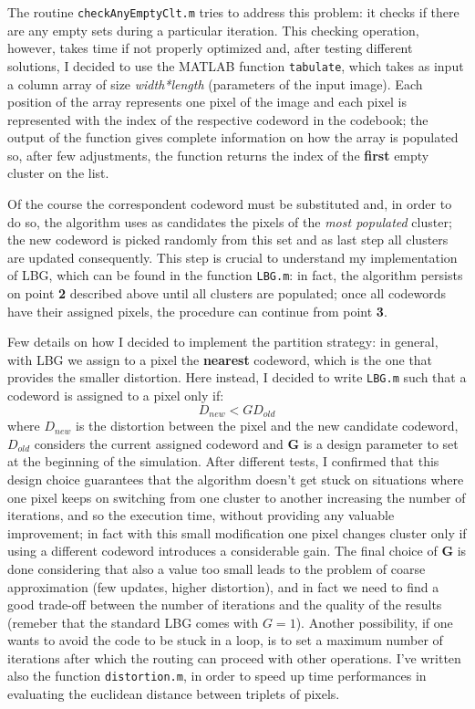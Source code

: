 \documentclass{article}
\def\code#1{\texttt{#1}}
\begin{document}
The routine \code{checkAnyEmptyClt.m} tries to address this problem: it checks if there are any empty sets during a particular iteration. This checking operation, however, takes time if not properly optimized and, after testing different solutions, I decided to use the MATLAB function \code{tabulate}, which takes as input a column array of size \textit{width*length} (parameters of the input image). Each position of the array represents one pixel of the image and each pixel is represented with the index of the respective codeword in the codebook; the output of the function gives complete information on how the array is populated so, after few adjustments, the function returns the index of the \textbf{first} empty cluster on the list. 

Of the course the correspondent codeword must be substituted and, in order to do so, the algorithm uses as candidates the pixels of the \textit{most populated} cluster; the new codeword is picked randomly from this set and as last step all clusters are updated consequently. This step is crucial to understand my implementation of LBG, which can be found in the function \code{LBG.m}: in fact, the algorithm persists on point \textbf{2} described above until all clusters are populated; once all codewords have their assigned pixels, the procedure can continue from point \textbf{3}.

Few details on how I decided to implement the partition strategy: in general, with LBG we assign to a pixel the \textbf{nearest} codeword, which is the one that provides the smaller distortion. Here instead, I decided to write \code{LBG.m} such that a codeword is assigned to a pixel only if: 
\begin{equation}
D_{new} < GD_{old}
\end{equation}
where $D_{new}$ is the distortion between the pixel and the new candidate codeword, $D_{old}$ considers the current assigned codeword and $\mathbf{G}$ is a design parameter to set at the beginning of the simulation. After different tests, I confirmed that this design choice guarantees that the algorithm doesn't get stuck on situations where one pixel keeps on switching from one cluster to another increasing the number of iterations, and so the execution time, without providing any valuable improvement; in fact with this small modification one pixel changes cluster only if using a different codeword introduces a considerable gain. The final choice of \textbf{G} is done considering that also a value too small leads to the problem of coarse approximation (few updates, higher distortion), and in fact we need to find a good trade-off between the number of iterations and the quality of the results (remeber that the standard LBG comes with $G = 1$).
Another possibility, if one wants to avoid the code to be stuck in a loop, is to set a maximum number of iterations after which the routing can proceed with other operations.
I've written also the function \code{distortion.m}, in order to speed up time performances in evaluating the euclidean distance between triplets of pixels.
\end{document}
